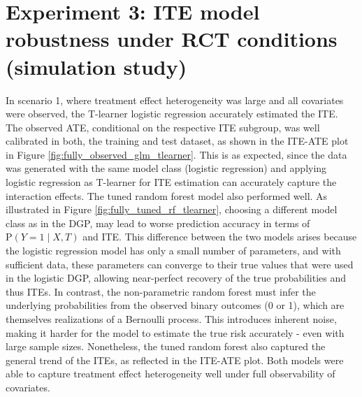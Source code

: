 \section{Experiment 3: ITE model robustness under RCT conditions (simulation study)}

In scenario 1, where treatment effect heterogeneity was large and all covariates were observed, the T-learner logistic regression accurately estimated the ITE. The observed ATE, conditional on the respective ITE subgroup, was well calibrated in both, the training and test dataset, as shown in the ITE-ATE plot in Figure \ref{fig:fully_observed_glm_tlearner}. This is as expected, since the data was generated with the same model class (logistic regression) and applying logistic regression as T-learner for ITE estimation can accurately capture the interaction effects. The tuned random forest model also performed well. As illustrated in Figure \ref{fig:fully_tuned_rf_tlearner}, choosing a different model class as in the DGP, may lead to worse prediction accuracy in terms of $\text{P}(Y=1 \mid X, T)$ and ITE. This difference between the two models arises because the logistic regression model has only a small number of parameters, and with sufficient data, these parameters can converge to their true values that were used in the logistic DGP, allowing near-perfect recovery of the true probabilities and thus ITEs. In contrast, the non-parametric random forest must infer the underlying probabilities from the observed binary outcomes (0 or 1), which are themselves realizations of a Bernoulli process. This introduces inherent noise, making it harder for the model to estimate the true risk accurately - even with large sample sizes. Nonetheless, the tuned random forest also captured the general trend of the ITEs, as reflected in the ITE-ATE plot. Both models were able to capture treatment effect heterogeneity well under full observability of covariates.


